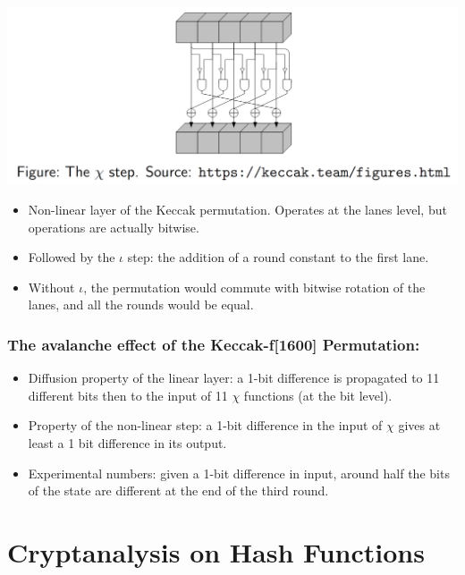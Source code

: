 		   	\begin{center}
				\includegraphics[width=140mm]{Graphics/Hash Functions/hf12.png}
			\end{center}
			\begin{itemize}
				\item Non-linear layer of the Keccak permutation. Operates at the lanes level, but operations are actually bitwise.
				\item Followed by the $\iota$ step: the addition of a round constant to the first lane.
				\item Without $\iota$, the permutation would commute with bitwise rotation of the lanes, and all the rounds would be equal.
			\end{itemize}
		
		\subsubsection{The avalanche effect of the Keccak-f[1600] Permutation:}
			\begin{itemize}
				\item Diffusion property of the linear layer: a 1-bit difference is propagated to 11 different bits then to the input of 11 $\chi$ functions (at the bit level).
				\item Property of the non-linear step: a 1-bit difference in the input of $\chi$ gives at least a 1 bit difference in its output.
				\item Experimental numbers: given a 1-bit difference in input, around half the bits of the state are different at the end of the third round.
			\end{itemize}

\newpage

\section{Cryptanalysis on Hash Functions}
